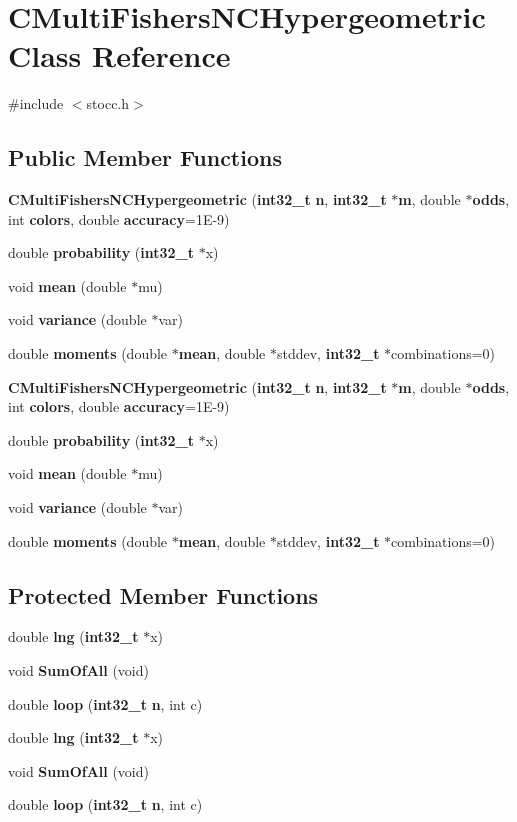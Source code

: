 \section{C\-Multi\-Fishers\-N\-C\-Hypergeometric Class Reference}
\label{class_c_multi_fishers_n_c_hypergeometric}


{\ttfamily \#include $<$stocc.\-h$>$}

\subsection*{Public Member Functions}
\begin{DoxyCompactItemize}
\item 
{\bf C\-Multi\-Fishers\-N\-C\-Hypergeometric} ({\bf int32\-\_\-t} {\bf n}, {\bf int32\-\_\-t} $\ast${\bf m}, double $\ast${\bf odds}, int {\bf colors}, double {\bf accuracy}=1\-E-\/9)
\item 
double {\bf probability} ({\bf int32\-\_\-t} $\ast$x)
\item 
void {\bf mean} (double $\ast$mu)
\item 
void {\bf variance} (double $\ast$var)
\item 
double {\bf moments} (double $\ast${\bf mean}, double $\ast$stddev, {\bf int32\-\_\-t} $\ast$combinations=0)
\item 
{\bf C\-Multi\-Fishers\-N\-C\-Hypergeometric} ({\bf int32\-\_\-t} {\bf n}, {\bf int32\-\_\-t} $\ast${\bf m}, double $\ast${\bf odds}, int {\bf colors}, double {\bf accuracy}=1\-E-\/9)
\item 
double {\bf probability} ({\bf int32\-\_\-t} $\ast$x)
\item 
void {\bf mean} (double $\ast$mu)
\item 
void {\bf variance} (double $\ast$var)
\item 
double {\bf moments} (double $\ast${\bf mean}, double $\ast$stddev, {\bf int32\-\_\-t} $\ast$combinations=0)
\end{DoxyCompactItemize}
\subsection*{Protected Member Functions}
\begin{DoxyCompactItemize}
\item 
double {\bf lng} ({\bf int32\-\_\-t} $\ast$x)
\item 
void {\bf Sum\-Of\-All} (void)
\item 
double {\bf loop} ({\bf int32\-\_\-t} {\bf n}, int c)
\item 
double {\bf lng} ({\bf int32\-\_\-t} $\ast$x)
\item 
void {\bf Sum\-Of\-All} (void)
\item 
double {\bf loop} ({\bf int32\-\_\-t} {\bf n}, int c)
\end{DoxyCompactItemize}
